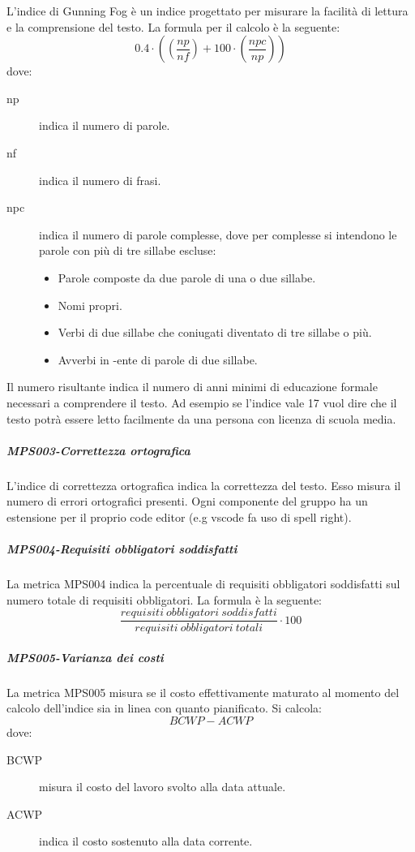 \documentclass[../norme-di-progetto.tex]{subfiles}
\begin{document}
L'indice di Gunning Fog è un indice progettato per misurare la facilità di lettura e la comprensione del testo. La formula per il calcolo è la seguente:
\[
    0.4\cdot((\frac{np}{nf})+100\cdot(\frac{npc}{np}))
\]
dove:
\begin{description}
  \item [np] indica il numero di parole.
  \item [nf] indica il numero di frasi.
  \item [npc] indica il numero di parole complesse, dove per complesse si intendono le parole con più di tre sillabe escluse:
  \begin{itemize}
    \item Parole composte da due parole di una o due sillabe.
    \item Nomi propri.
    \item Verbi di due sillabe che coniugati diventato di tre sillabe o più.
    \item Avverbi in -ente di parole di due sillabe.
  \end{itemize}
 \end{description}
  Il numero risultante indica il numero di anni minimi di educazione formale necessari a comprendere il testo. Ad esempio se l'indice vale 17 vuol dire che il testo potrà essere letto facilmente da una persona con licenza di scuola media.

\subparagraph{MPS003-Correttezza ortografica}%
\label{subp:MPS003-correttezza_ortografica}

L'indice di correttezza ortografica indica la correttezza del testo. Esso misura il numero di errori ortografici presenti. Ogni componente del gruppo ha un estensione per il proprio code editor (e.g vscode fa uso di spell right).

\subparagraph{MPS004-Requisiti obbligatori soddisfatti}%
\label{subp:MPS004-requisiti_obbligatori_soddisfatti}

La metrica MPS004 indica la percentuale di requisiti obbligatori soddisfatti sul numero totale di requisiti obbligatori. La formula è la seguente:
\[
\frac{requisiti\ obbligatori\ soddisfatti}{requisiti\ obbligatori\ totali}\cdot 100
\]

\subparagraph{MPS005-Varianza dei costi}%
\label{subp:MPS005-varianza_dei_costi}

La metrica MPS005 misura se il costo effettivamente maturato al momento del calcolo dell'indice sia in linea con quanto pianificato. Si calcola:
\[
   BCWP-ACWP
\]
dove:
\begin{description}
  \item [BCWP] misura il costo del lavoro svolto alla data attuale.
  \item [ACWP] indica il costo sostenuto alla data corrente.
 \end{description}
\end{document}
